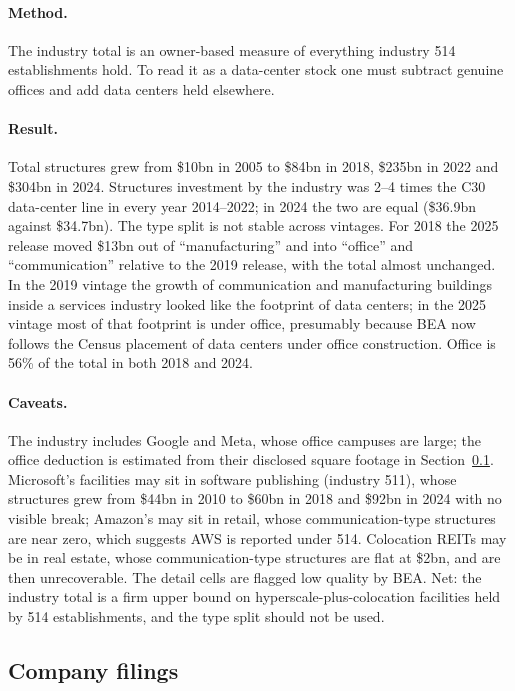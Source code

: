 \documentclass[11pt]{article}
\begin{document}
\paragraph{Method.} The industry total is an owner-based measure of everything industry 514 establishments hold. To read it as a data-center stock one must subtract genuine offices and add data centers held elsewhere.

\paragraph{Result.} Total structures grew from \$10bn in 2005 to \$84bn in 2018, \$235bn in 2022 and \$304bn in 2024. Structures investment by the industry was 2--4 times the C30 data-center line in every year 2014--2022; in 2024 the two are equal (\$36.9bn against \$34.7bn). The type split is not stable across vintages. For 2018 the 2025 release moved \$13bn out of ``manufacturing'' and into ``office'' and ``communication'' relative to the 2019 release, with the total almost unchanged. In the 2019 vintage the growth of communication and manufacturing buildings inside a services industry looked like the footprint of data centers; in the 2025 vintage most of that footprint is under office, presumably because BEA now follows the Census placement of data centers under office construction. Office is 56\% of the total in both 2018 and 2024.

\paragraph{Caveats.} The industry includes Google and Meta, whose office campuses are large; the office deduction is estimated from their disclosed square footage in Section~\ref{sec:filings}. Microsoft's facilities may sit in software publishing (industry 511), whose structures grew from \$44bn in 2010 to \$60bn in 2018 and \$92bn in 2024 with no visible break; Amazon's may sit in retail, whose communication-type structures are near zero, which suggests AWS is reported under 514. Colocation REITs may be in real estate, whose communication-type structures are flat at \$2bn, and are then unrecoverable. The detail cells are flagged low quality by BEA. Net: the industry total is a firm upper bound on hyperscale-plus-colocation facilities held by 514 establishments, and the type split should not be used.

\subsection{Company filings}
\label{sec:filings}
\end{document}
